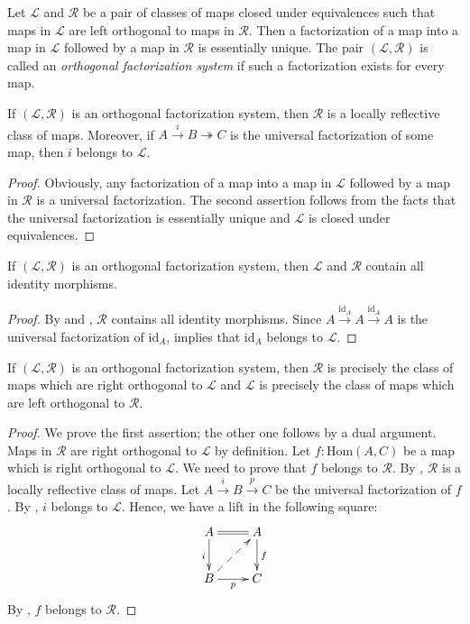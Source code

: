 \documentclass[reqno]{mscs}
\newcommand{\fs}[1]{\mathrm{#1}}
\newcommand{\Hom}{\fs{Hom}}
\newcommand{\id}{\fs{id}}
\numberwithin{figure}{section}
\begin{document}
Let $\mathcal{L}$ and $\mathcal{R}$ be a pair of classes of maps closed under equivalences such that maps in $\mathcal{L}$ are left orthogonal to maps in $\mathcal{R}$.
Then a factorization of a map into a map in $\mathcal{L}$ followed by a map in $\mathcal{R}$ is essentially unique.
The pair $(\mathcal{L},\mathcal{R})$ is called an \emph{orthogonal factorization system} if such a factorization exists for every map.

\begin{lem}
If $(\mathcal{L},\mathcal{R})$ is an orthogonal factorization system, then $\mathcal{R}$ is a locally reflective class of maps.
Moreover, if $A \xrightarrow{i} B \twoheadrightarrow C$ is the universal factorization of some map, then $i$ belongs to $\mathcal{L}$.
\end{lem}
\begin{proof}
Obviously, any factorization of a map into a map in $\mathcal{L}$ followed by a map in $\mathcal{R}$ is a universal factorization.
The second assertion follows from the facts that the universal factorization is essentially unique and $\mathcal{L}$ is closed under equivalences.
\end{proof}

\begin{prop}
If $(\mathcal{L},\mathcal{R})$ is an orthogonal factorization system, then $\mathcal{L}$ and $\mathcal{R}$ contain all identity morphisms.
\end{prop}
\begin{proof}
By  and , $\mathcal{R}$ contains all identity morphisms.
Since $A \xrightarrow{\id_A} A \xrightarrow{\id_A} A$ is the universal factorization of $\id_A$,  implies that $\id_A$ belongs to $\mathcal{L}$.
\end{proof}

\begin{prop}
If $(\mathcal{L},\mathcal{R})$ is an orthogonal factorization system, then
$\mathcal{R}$ is precisely the class of maps which are right orthogonal to $\mathcal{L}$ and
$\mathcal{L}$ is precisely the class of maps which are left orthogonal to $\mathcal{R}$.
\end{prop}
\begin{proof}
We prove the first assertion; the other one follows by a dual argument.
Maps in $\mathcal{R}$ are right orthogonal to $\mathcal{L}$ by definition.
Let $f : \Hom(A,C)$ be a map which is right orthogonal to $\mathcal{L}$.
We need to prove that $f$ belongs to $\mathcal{R}$.
By , $\mathcal{R}$ is a locally reflective class of maps.
Let $A \xrightarrow{i} B \xrightarrow{p} C$ be the universal factorization of $f$.
By , $i$ belongs to $\mathcal{L}$.
Hence, we have a lift in the following square:
\[ \xymatrix{ A \ar@{=}[r] \ar[d]_i     & A \ar[d]^f \\
              B \ar[r]_p \ar@{-->}[ur]  & C
            } \]
By , $f$ belongs to $\mathcal{R}$.
\end{proof}
\end{document}

